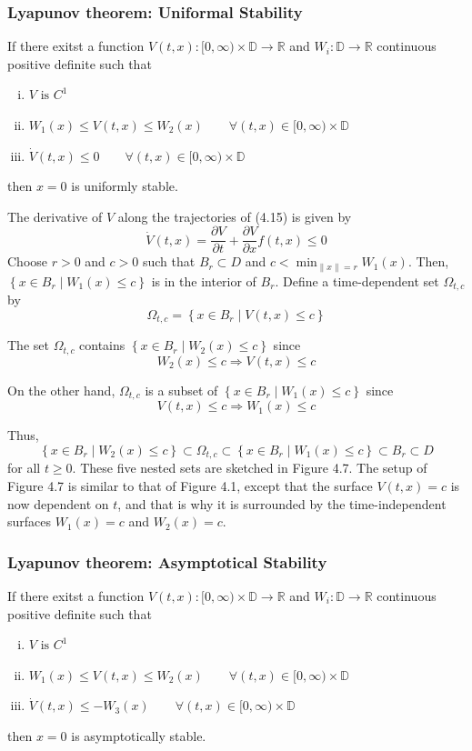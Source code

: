 \documentclass{article}
\newcommand{\mathbbD}{\mathbb{D}}
\newcommand{\mathbbR}{\mathbb{R}}
\begin{document}
\subsubsection{Lyapunov theorem: Uniformal Stability}
If there exitst a function $V(t,x):[0, \infty) \times \mathbbD \rightarrow
	\mathbbR$ and $W_i: \mathbb{D} \rightarrow \mathbb{R}$ continuous positive
definite such that
\begin{enumerate}[i)]
	\item $V \text{ is } C^1$
	\item $W_1(x) \leq V(t,x) \leq W_2(x) \qquad \forall (t,x) \in [0, \infty) \times \mathbb{D}$
	\item $\dot V(t,x) \leq 0 \qquad \forall (t,x) \in [0, \infty) \times \mathbb{D}$
\end{enumerate}
then $x=0$ is uniformly stable.
\begin{figure}[h]
	\centering
	\resizebox{0.45\textwidth}{!}{}
\end{figure}
\begin{frm-prf}
The derivative of $V$ along the trajectories of (4.15) is given by
$$
	\dot{V}(t, x)=\frac{\partial V}{\partial t}+\frac{\partial V}{\partial x} f(t, x) \leq 0
$$
Choose $r>0$ and $c>0$ such that $B_r \subset D$ and $c<\min _{\|x\|=r}
	W_1(x)$. Then, $\left\{x \in B_r \mid W_1(x) \leq c\right\}$ is in the interior
of $B_r$. Define a time-dependent set $\Omega_{t, c}$ by $$ \Omega_{t,
		c}=\left\{x \in B_r \mid V(t, x) \leq c\right\} $$

The set $\Omega_{t, c}$ contains $\left\{x \in B_r \mid W_2(x) \leq c\right\}$
since $$ W_2(x) \leq c \Rightarrow V(t, x) \leq c $$

On the other hand, $\Omega_{t, c}$ is a subset of $\left\{x \in B_r \mid W_1(x)
	\leq c\right\}$ since $$ V(t, x) \leq c \Rightarrow W_1(x) \leq c $$

Thus, $$ \left\{x \in B_r \mid W_2(x) \leq c\right\} \subset \Omega_{t, c}
	\subset\left\{x \in B_r \mid W_1(x) \leq c\right\} \subset B_r \subset D $$ for
all $t \geq 0$. These five nested sets are sketched in Figure 4.7. The setup of
Figure 4.7 is similar to that of Figure 4.1, except that the surface $V(t,
	x)=c$ is now dependent on $t$, and that is why it is surrounded by the
time-independent surfaces $W_1(x)=c$ and $W_2(x)=c$.
\end{frm-prf}
\subsubsection{Lyapunov theorem: Asymptotical Stability}
If there exitst a function $V(t,x):[0, \infty) \times \mathbbD \rightarrow
	\mathbbR$ and $W_i: \mathbb{D} \rightarrow \mathbb{R}$ continuous positive
definite such that
\begin{enumerate}[i)]
	\item $V \text{ is } C^1$
	\item $W_1(x) \leq V(t,x) \leq W_2(x) \qquad \forall (t,x) \in [0, \infty) \times \mathbb{D}$
	\item $\dot V(t,x) \leq -W_3(x) \qquad \forall (t,x) \in [0, \infty) \times \mathbb{D}$
\end{enumerate}
then $x=0$ is asymptotically stable.
\end{document}
